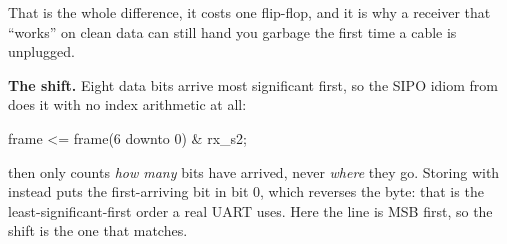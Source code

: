 \begin{parts}
    That is the whole difference, it costs one flip-flop, and it is why a receiver that ``works'' on
    clean data can still hand you garbage the first time a cable is unplugged.

    \textbf{The shift.} Eight data bits arrive most significant first, so the SIPO idiom from
     does it with no index arithmetic at all:

\begin{vhdlcode}
frame <= frame(6 downto 0) & rx_s2;
\end{vhdlcode}

     then only counts \emph{how many} bits have arrived, never \emph{where} they go.
    Storing with  instead puts the first-arriving bit in bit 0,
    which reverses the byte: that is the least-significant-first order a real UART uses. Here the
    line is MSB first, so the shift is the one that matches.


\end{parts}
